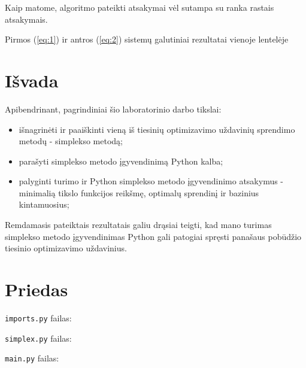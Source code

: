 \documentclass{article}
\begin{document}
Kaip matome, algoritmo pateikti atsakymai vėl sutampa su ranka rastais atsakymais.
\begin{table}[H]
    \centering
    \caption{Pirmos (\ref{eq:1}) ir antros (\ref{eq:2}) sistemų galutiniai rezultatai vienoje lentelėje}
    \label{table:12}
\end{table}
\section{Išvada}
Apibendrinant, pagrindiniai šio laboratorinio darbo tikslai:
\begin{itemize}
    \item išnagrinėti ir paaiškinti vieną iš tiesinių optimizavimo uždavinių sprendimo metodų - simplekso metodą; 
    \item parašyti simplekso metodo įgyvendinimą Python kalba;
    \item palyginti turimo ir Python simplekso metodo įgyvendinimo atsakymus - minimalią tikslo funkcijos reikšmę, optimalų sprendinį ir bazinius kintamuosius;
\end{itemize}
Remdamasis pateiktais rezultatais galiu drąsiai teigti, kad mano turimas simplekso metodo įgyvendinimas Python gali patogiai spręsti panašaus pobūdžio tiesinio optimizavimo uždavinius.
\section{Priedas}
\lstinline|imports.py| failas:

\lstinline|simplex.py| failas:

\lstinline|main.py| failas:
\end{document}
